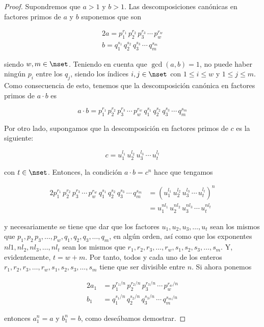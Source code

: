 \begin{proof}
  Supondremos que $a > 1$ y $b > 1$. Las descomposiciones canónicas en
  factores primos de $a$ y $b$ suponemos que son

  \begin{alignat*}{2}
    a = p_1^{r_1} \, p_2^{r_2} \, p_3^{r_3} \, \cdots \, p_w^{r_w} \\
    b = q_1^{s_1} \, q_2^{s_2} \, q_3^{s_3} \, \cdots \, q_m^{s_m}
  \end{alignat*}

  \noindent siendo $w, m \in \nset$. Teniendo en cuenta que $\gcd(a, b) =
  1$, no puede haber ningún $p_i$ entre los $q_j$, siendo los índices $i, j
  \in \nset$ con $1 \leq i \leq w$ y $1 \leq j \leq m$. Como consecuencia de
  esto, tenemos que la descomposición canónica en factores primos de $a
  \cdot b$ es

  $$ a \cdot b = p_1^{r_1} \, p_2^{r_2} \, p_3^{r_3} \, \cdots \, p_w^{r_w}
  \, q_1^{s_1} \, q_2^{s_2} \, q_3^{s_3} \, \cdots \, q_m^{s_m} $$

  Por otro lado, supongamos que la descomposición en factores primos de $c$
  es la siguiente:

  $$ c = u_1^{l_1} \, u_2^{l_2} \, u_3^{l_3} \, \cdots \, u_t^{l_t} $$

  \noindent con $t \in \nset$. Entonces, la condición $a \cdot b = c^n$ hace
  que tengamos

  \begin{alignat*}{2}
    p_1^{r_1} \, p_2^{r_2} \, p_3^{r_3} \, \cdots \, p_w^{r_w} \, q_1^{s_1}
      \, q_2^{s_2} \, q_3^{s_3} \, \cdots \, q_m^{s_m}
      &= \left( u_1^{l_1} \, u_2^{l_2} \, u_3^{l_3} \, \cdots \, u_t^{l_t} \right)^n \\
      &= u_1^{nl_1} \, u_2^{nl_2} \, u_3^{nl_3} \, \cdots \, u_t^{nl_t}
  \end{alignat*}

  \noindent y necesariamente se tiene que dar que los factores $u_1, u_2,
  u_3, \ldots, u_t$ sean los mismos que $p_1, p_2\, p_3, \ldots, p_w, q_1,
  q_2, q_3, \ldots, q_m$, en algún orden, así como que los exponentes $nl1,
  nl_2, nl_3, \ldots, nl_t$ sean los mismos que $r_1, r_2, r_3, \ldots, r_w,
  s_1, s_2, s_3, \ldots, s_m$. Y, evidentemente, $t = w + m$. Por tanto,
  todos y cada uno de los enteros $r_1, r_2, r_3, \ldots, r_w, s_1, s_2,
  s_3, \ldots, s_m$ tiene que ser divisible entre $n$. Si ahora ponemos

  \begin{alignat*}{2}
    a_1 &= p_1^{r_1/n} \, p_2^{r_2/n} \, p_3^{r_3/n} \, \cdots \,
      p_w^{r_w/n} \\
    b_1 &= q_1^{s_1/n} \, q_2^{s_2/n} \, q_3^{s_3/n} \, \cdots \,
      q_m^{s_m/n}
  \end{alignat*}

  \noindent entonces $a_1^n = a$ y $b_1^n = b$, como deseábamos demostrar.
\end{proof}
